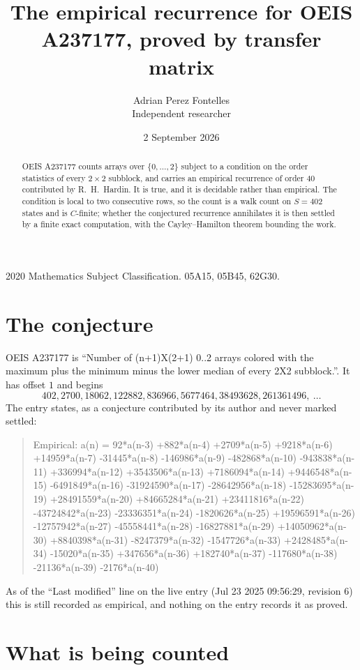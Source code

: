 \documentclass[11pt,a4paper]{article}
\title{The empirical recurrence for OEIS A237177, proved by transfer matrix}
\author{Adrian Perez Fontelles\\ \small Independent researcher}
\date{2 September 2026}
\theoremstyle{plain}
\theoremstyle{definition}
\begin{document}
\maketitle

\begin{abstract}
OEIS A237177 counts arrays over $\{0,\dots,2\}$ subject to a condition on the order
statistics of every $2\times2$ subblock, and carries an empirical recurrence of order
$40$ contributed by R.~H.~Hardin. It is true, and it is decidable rather than empirical.
The condition is local to two consecutive rows, so the count is a walk count on $S=402$
states and is $C$-finite; whether the conjectured recurrence annihilates it is then settled by
a finite exact computation, with the Cayley--Hamilton theorem bounding the work.
\end{abstract}

\noindent\small 2020 Mathematics Subject Classification. 05A15, 05B45, 62G30.\normalsize

\section{The conjecture}

OEIS A237177 is ``Number of (n+1)X(2+1) 0..2 arrays colored with the maximum plus the minimum minus the lower median of every 2X2 subblock.''. It has offset $1$ and begins
\[
402, 2700, 18062, 122882, 836966, 5677464, 38493628, 261361496,\ \dots
\]
The entry states, as a conjecture contributed by its author and never marked settled:
\begin{quote}
Empirical: a(n) = 92*a(n-3) +882*a(n-4) +2709*a(n-5) +9218*a(n-6) +14959*a(n-7) -31445*a(n-8) -146986*a(n-9) -482868*a(n-10) -943838*a(n-11) +336994*a(n-12) +3543506*a(n-13) +7186094*a(n-14) +9446548*a(n-15) -6491849*a(n-16) -31924590*a(n-17) -28642956*a(n-18) -15283695*a(n-19) +28491559*a(n-20) +84665284*a(n-21) +23411816*a(n-22) -43724842*a(n-23) -23336351*a(n-24) -1820626*a(n-25) +19596591*a(n-26) -12757942*a(n-27) -45558441*a(n-28) -16827881*a(n-29) +14050962*a(n-30) +8840398*a(n-31) -8247379*a(n-32) -1547726*a(n-33) +2428485*a(n-34) -15020*a(n-35) +347656*a(n-36) +182740*a(n-37) -117680*a(n-38) -21136*a(n-39) -2176*a(n-40)
\end{quote}
As of the ``Last modified'' line on the live entry (Jul 23 2025 09:56:29, revision 6) this is still
recorded as empirical, and nothing on the entry records it as proved.

\section{What is being counted}
\end{document}
